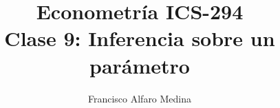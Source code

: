 \documentclass{beamer}
\title[ICS-162]{Econometría ICS-294\\ \small{Clase 9: Inferencia sobre un parámetro}}
\author{Francisco Alfaro Medina}
\institute[USM]
{Universidad Técnica Federico Santa María\\ %
	\medskip
	\textit{} %
	
}
\date{}
\begin{document}
	
\begin{frame}
	\titlepage %


\end{frame}


\end{document}
